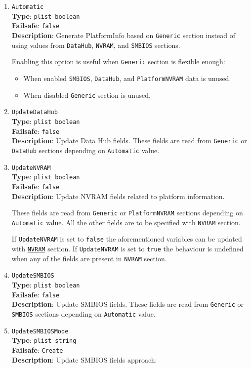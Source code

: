 \documentclass[]{article}
\providecommand{\tightlist}{%
  \setlength{\itemsep}{0pt}\setlength{\parskip}{0pt}}
\begin{document}
\begin{enumerate}
\item
  \texttt{Automatic}\\
  \textbf{Type}: \texttt{plist\ boolean}\\
  \textbf{Failsafe}: \texttt{false}\\
  \textbf{Description}: Generate PlatformInfo based on \texttt{Generic}
  section instead of using values from \texttt{DataHub}, \texttt{NVRAM},
  and \texttt{SMBIOS} sections.

  Enabling this option is useful when \texttt{Generic} section is flexible
  enough:
  \begin{itemize}
  \tightlist
  \item When enabled \texttt{SMBIOS}, \texttt{DataHub}, and
  \texttt{PlatformNVRAM} data is unused.
  \item When disabled \texttt{Generic} section is unused.
  \end{itemize}
\item
  \texttt{UpdateDataHub}\\
  \textbf{Type}: \texttt{plist\ boolean}\\
  \textbf{Failsafe}: \texttt{false}\\
  \textbf{Description}: Update Data Hub fields. These fields are read
  from \texttt{Generic} or \texttt{DataHub} sections depending on
  \texttt{Automatic} value.
\item
  \texttt{UpdateNVRAM}\\
  \textbf{Type}: \texttt{plist\ boolean}\\
  \textbf{Failsafe}: \texttt{false}\\
  \textbf{Description}: Update NVRAM fields related to platform information.

  These fields are read from \texttt{Generic} or \texttt{PlatformNVRAM} sections
  depending on \texttt{Automatic} value. All the other fields are
  to be specified with \texttt{NVRAM} section.

  If \texttt{UpdateNVRAM} is set to \texttt{false} the aforementioned
  variables can be updated with \hyperref[nvram]{\texttt{NVRAM}}
  section. If \texttt{UpdateNVRAM} is set to \texttt{true} the behaviour is
  undefined when any of the fields are present in \texttt{NVRAM} section.
\item
  \texttt{UpdateSMBIOS}\\
  \textbf{Type}: \texttt{plist\ boolean}\\
  \textbf{Failsafe}: \texttt{false}\\
  \textbf{Description}: Update SMBIOS fields. These fields are read from
  \texttt{Generic} or \texttt{SMBIOS} sections depending on
  \texttt{Automatic} value.
\item
  \texttt{UpdateSMBIOSMode}\\
  \textbf{Type}: \texttt{plist\ string}\\
  \textbf{Failsafe}: \texttt{Create}\\
  \textbf{Description}: Update SMBIOS fields approach:


\end{enumerate}
\end{document}
